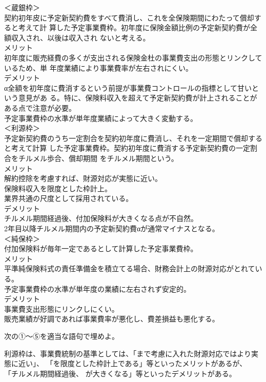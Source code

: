 \documentclass[report,gutter=10mm,fore-edge=10mm,uplatex,dvipdfmx]{jlreq}
\begin{document}
\answer{}
\noindent ＜蔵銀枠＞\\
契約初年皮に予定新契約費をすべて費消し、これを全保険期間にわたって償却すると考えて計
算した予定事業費枠。初年度に保険金額比例の予定新契約費が全額収入され、以後は収入され
ないと考える。\\
メリット \\
初年度に販売経費の多くが支出される保険金杜の事業費支出の形態とリンクしているため、単
年度業績により事業費率が左右されにくい。\\
デメリット\\
α全額を初年度に費消するという前提が事業費コントロールの指標として甘いという意見があ
る。特に、保険料収入を超えて予定新契約費が計上されることがある点で注意が必要。\\
予定事業費枠の水準が単年度業績によって大きく変動する。\\

\noindent＜利源枠＞\\
予定新契約費のうち一定割合を契約初年度に費消し、それを一定期間で償却すると考えて計算
した予定事業費枠。契約初年度に費消する予定新契約費の一定割合をチルメル歩合、償却期間
をチルメル期間という。\\
メリット \\
解約控除を考慮すれば、財源対応が実態に近い。\\
保険料収入を限度とした枠計上。\\
業界共通の尺度として採用されている。\\
デメリット\\
チルメル期間経過後、付加保険料が大きくなる点が不自然。\\
2年目以降チルメル期間内の予定新契約費αが通常マイナスとなる。\\

\noindent＜純保枠＞\\
付加保険料が毎年一定であるとして計算した予定事業費枠。\\
メリット \\
平準純保険料式の責任準備金を積立てる場合、財務会計上の財源対応がとれている。\\
予定事業費枠の水準が単年度の業績に左右されず安定的。\\
デメリット\\
事業費支出形態にリンクしにくい。\\
販売業績が好調であれば事業費率が悪化し、費差損益も悪化する。

次の①～⑤を適当な語句で埋めよ。

利源枠は、事業費統制の基準としては、「まで考慮に入れた財源対応ではより実態に近い」、
「を限度とした枠計上である」等といったメリットがあるが、
「チルメル期間経過後、 が大きくなる」等といったデメリットがある。
\end{document}
